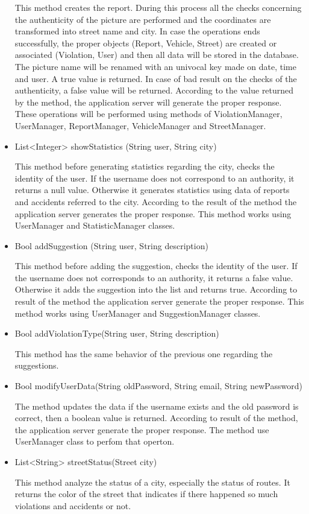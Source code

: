 \begin{itemize}
	 This method creates the report. During this process all the checks concerning the authenticity of the picture are performed and the coordinates are transformed into street name and city. In case the operations ends successfully, the proper objects (Report, Vehicle, Street) are created or associated (Violation, User) and then all data will be stored in the database. The picture name will be renamed with an univocal key made on date, time and user. A true value is returned.
	 In case of bad result on the checks of the authenticity, a false value will be returned.
	 According to the value returned by the method, the application server will generate the proper response. 
	 These operations will be performed using methods of ViolationManager, UserManager, ReportManager, VehicleManager and StreetManager.
	 
	 \item
	List<Integer> showStatistics (String user, String city)
	
	This method before generating statistics regarding the city, checks the identity of the user. 
	If the username does not correspond to an authority, it returns a null value.
	Otherwise it generates statistics using data of reports and accidents referred to the city.
	According to the result of the method the application server generates the proper response.
	This method works using UserManager and StatisticManager classes.
	
	\item 
	Bool addSuggestion (String user, String description)
	
	This method before adding the suggestion, checks the identity of the user. 
	If the username does not corresponds to an authority, it returns a false value.
	Otherwise it adds the suggestion into the list and returns true.
	According to result of the method the application server generate the proper response.
	This method works using UserManager and SuggestionManager classes.
	
	\item 
	Bool addViolationType(String user, String description)
	
	This method has the same behavior of the previous one regarding the suggestions.
	
	\item 
	Bool modifyUserData(String oldPassword, String email, String newPassword)
	
	The method updates the data if the username exists and the old password is correct, then
	a boolean value is returned. According to result of the method, the application server generate the proper response.
	The method use UserManager class to perfom that operton.
	
	\item
	List<String> streetStatus(Street city)
	
	This method analyze the status of a city, especially the status of routes. It returns the color of the street that indicates if there happened so much violations and accidents or not.
\end{itemize}

